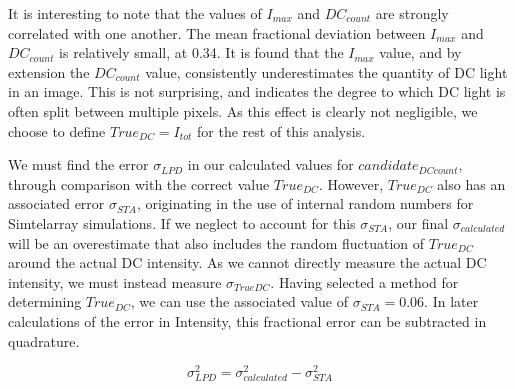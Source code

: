 \documentclass{article}
\begin{document}
It is interesting to note that the values of $I_{max}$ and $DC_{count}$ are strongly correlated with one another. The mean fractional deviation between $I_{max}$ and $DC_{count}$ is relatively small, at 0.34. It is found that the $I_{max}$ value, and by extension the $DC_{count}$ value, consistently underestimates the quantity of DC light in an image. This is not surprising, and indicates the degree to which DC light is often split between multiple pixels. As this effect is clearly not negligible, we choose to define $True_{DC}=I_{tot}$ for the rest of this analysis.

We must find the error $\sigma_{LPD}$ in our calculated values for $candidate_{DC count}$, through comparison with the correct value $True_{DC}$. However, $True_{DC}$ also has an associated error $\sigma_{STA}$, originating in the use of internal random numbers for Sim\textunderscore telarray simulations. If we neglect to account for this $\sigma_{STA}$, our final $\sigma_{calculated}$ will be an overestimate that also includes the random fluctuation of $True_{DC}$ around the actual DC intensity. As we cannot directly measure the actual DC intensity, we must instead measure $\sigma_{TrueDC}$. Having selected a method for determining $True_{DC}$, we can use the associated value of $\sigma_{STA}=0.06$. In later calculations of the error in Intensity, this fractional error can be subtracted in quadrature. 

\[ \sigma_{LPD}^{2} = \sigma_{calculated}^{2} - \sigma_{STA}^{2}  \]
\end{document}
